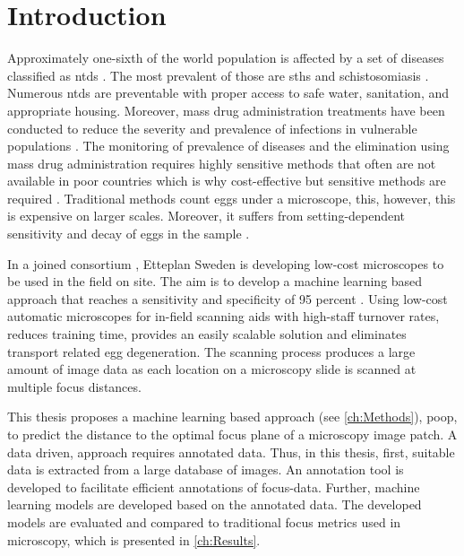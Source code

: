 \chapter{Introduction}
\label{ch:Introduction}

Approximately one-sixth of the world population is affected by a set of diseases classified as \acfp{ntd} \cite{feasey2010neglected}. The most prevalent of those are \acfp{sth} and schistosomiasis \cite{barenbold2017estimating}. Numerous \acp{ntd} are preventable with proper access to safe water, sanitation, and appropriate housing. Moreover, mass drug administration treatments have been conducted to reduce the severity and prevalence of infections in vulnerable populations \cite{jourdan2018soiltransmitted}. The monitoring of prevalence of diseases and the elimination using mass drug administration requires highly sensitive methods that often are not available in poor countries which is why cost-effective but sensitive methods are required \cite{mbongngwese2020diagnostic}.
Traditional methods count eggs under a microscope, this, however, this is expensive on larger scales. Moreover, it suffers from setting-dependent sensitivity and decay of eggs in the sample \cite{barenbold2017estimating}. 

In a joined consortium , Etteplan Sweden \cite{etteplanoyjengineering} is developing low-cost microscopes to be used in the field on site. The aim is to develop a machine learning based approach that reaches a sensitivity and specificity of 95 percent 
\cite{etteplan2021fighting}. Using low-cost automatic microscopes for in-field scanning aids with high-staff turnover rates, reduces training time, provides an easily scalable solution and eliminates transport related egg degeneration.
The scanning process produces a large amount of image data as each location on a microscopy slide is scanned at multiple focus distances.

This thesis proposes a machine learning based approach (see \autoref{ch:Methods}), \ac{poop}, to predict the distance to the optimal focus plane of a microscopy image patch. A data driven, approach requires annotated data. Thus, in this thesis, first, suitable data is extracted from a large database of images. An annotation tool is developed to facilitate efficient annotations of focus-data. Further, machine learning models are developed based on the annotated data. The developed models are evaluated and compared to traditional focus metrics used in microscopy, which is presented in \autoref{ch:Results}.

